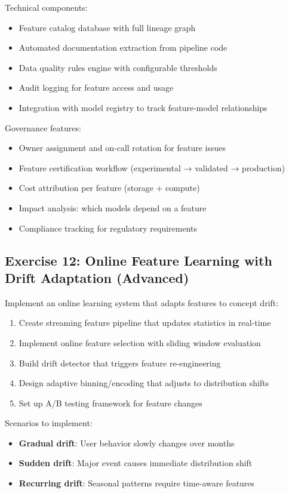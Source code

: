 Technical components:
\begin{itemize}
    \item Feature catalog database with full lineage graph
    \item Automated documentation extraction from pipeline code
    \item Data quality rules engine with configurable thresholds
    \item Audit logging for feature access and usage
    \item Integration with model registry to track feature-model relationships
\end{itemize}

Governance features:
\begin{itemize}
    \item Owner assignment and on-call rotation for feature issues
    \item Feature certification workflow (experimental → validated → production)
    \item Cost attribution per feature (storage + compute)
    \item Impact analysis: which models depend on a feature
    \item Compliance tracking for regulatory requirements
\end{itemize}

\subsection{Exercise 12: Online Feature Learning with Drift Adaptation (Advanced)}

Implement an online learning system that adapts features to concept drift:

\begin{enumerate}
    \item Create streaming feature pipeline that updates statistics in real-time
    \item Implement online feature selection with sliding window evaluation
    \item Build drift detector that triggers feature re-engineering
    \item Design adaptive binning/encoding that adjusts to distribution shifts
    \item Set up A/B testing framework for feature changes
\end{enumerate}

Scenarios to implement:
\begin{itemize}
    \item \textbf{Gradual drift}: User behavior slowly changes over months
    \item \textbf{Sudden drift}: Major event causes immediate distribution shift
    \item \textbf{Recurring drift}: Seasonal patterns require time-aware features
\end{itemize}

